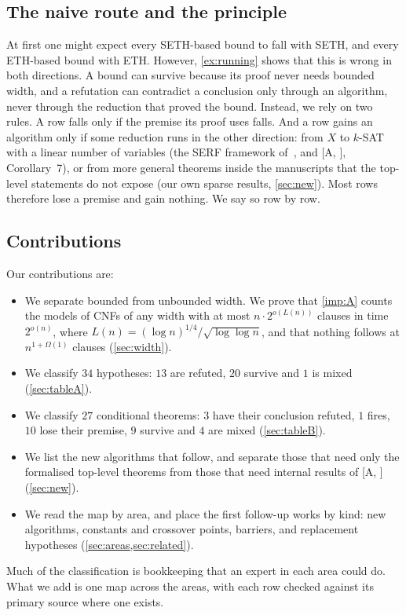\documentclass[10pt]{amsart}
\theoremstyle{plain}
\theoremstyle{definition}
\theoremstyle{remark}
\numberwithin{equation}{section}
\newcommand{\A}[1][]{\textup{[A\if\relax\detokenize{#1}\relax\else, #1\fi]}}
\begin{document}
\subsection{The naive route and the principle}
At first one might expect every SETH-based bound to fall with SETH, and every ETH-based bound with
ETH. However, \cref{ex:running} shows that this is wrong in both directions. A bound can survive
because its proof never needs bounded width, and a refutation can contradict a conclusion only
through an algorithm, never through the reduction that proved the bound. Instead, we rely on two
rules. A row falls only if the premise its proof uses falls. And a row gains an algorithm only if
some reduction runs in the other direction: from $X$ to $k$-SAT with a linear number of variables
(the SERF framework of~\cite{IPZ01}, and \A, Corollary~7), or from more general theorems inside the
manuscripts that the top-level statements do not expose (our own sparse results, \cref{sec:new}).
Most rows therefore lose a premise and gain nothing. We say so row by row.

\subsection{Contributions}
Our contributions are:
\begin{itemize}
\item We separate bounded from unbounded width. We prove that \cref{imp:A} counts the models of CNFs
of any width with at most $n\cdot2^{o(L(n))}$ clauses in time $2^{o(n)}$, where
$L(n)=(\log n)^{1/4}/\sqrt{\log\log n}$, and that nothing follows at $n^{1+\Omega(1)}$ clauses
(\cref{sec:width}).
\item We classify $34$ hypotheses: $13$ are refuted, $20$ survive and $1$ is mixed
(\cref{sec:tableA}).
\item We classify $27$ conditional theorems: $3$ have their conclusion refuted, $1$ fires, $10$ lose
their premise, $9$ survive and $4$ are mixed (\cref{sec:tableB}).
\item We list the new algorithms that follow, and separate those that need only the formalised
top-level theorems from those that need internal results of \A{} (\cref{sec:new}).
\item We read the map by area, and place the first follow-up works by kind: new algorithms,
constants and crossover points, barriers, and replacement hypotheses
(\cref{sec:areas,sec:related}).
\end{itemize}
Much of the classification is bookkeeping that an expert in each area could do. What we add is one
map across the areas, with each row checked against its primary source where one exists.
\end{document}
